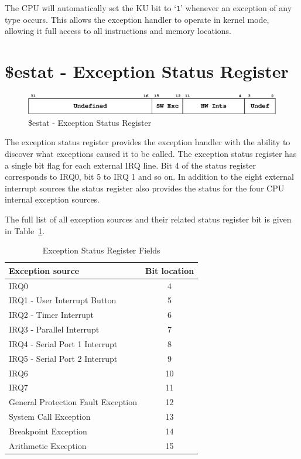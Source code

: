 \documentclass[a4paper,10pt]{article}
\begin{document}
The CPU will automatically set the KU bit to `\texttt{1}' whenever an
exception of any type occurs. This allows the exception handler to
operate in kernel mode, allowing it full access to all instructions
and memory locations.

\newpage
\section{\$estat - Exception Status Register}
\label{appen:estat}

\begin{figure}[h]
\begin{center}
\includegraphics[width=\textwidth]{estat.eps}
\caption{\$estat - Exception Status Register}
\label{estat_pic}
\end{center}
\end{figure}

The exception status register provides the exception handler with the
ability to discover what exceptions caused it to be called. The
exception status register has a single bit flag for each external IRQ
line. Bit 4 of the status register corresponds to IRQ0, bit 5 to IRQ 1
and so on. In addition to the eight external interrupt sources the
status register also provides the status for the four CPU internal
exception sources.

The full list of all exception sources and their related status
register bit is given in Table~\ref{table:sta_loc}.

\begin{table}[h]
\begin{center}
\begin{tabular}{|l|c|}
\hline
\textbf{Exception source} & \textbf{Bit location} \\
\hline
IRQ0 & 4 \\
\hline
IRQ1 - User Interrupt Button & 5 \\
\hline
IRQ2 - Timer Interrupt & 6 \\
\hline
IRQ3 - Parallel Interrupt & 7 \\
\hline
IRQ4 - Serial Port 1 Interrupt & 8 \\
\hline
IRQ5 - Serial Port 2 Interrupt & 9 \\
\hline
IRQ6 & 10 \\
\hline
IRQ7 & 11 \\
\hline
General Protection Fault Exception & 12 \\
\hline
System Call Exception & 13 \\
\hline
Breakpoint Exception & 14 \\
\hline
Arithmetic Exception & 15 \\
\hline
\end{tabular}
\caption{Exception Status Register Fields}
\label{table:sta_loc}
\end{center}
\end{table}
\end{document}
